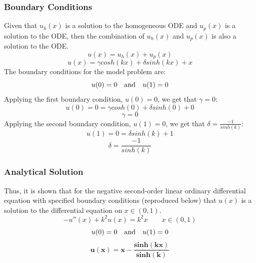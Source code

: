 \documentclass[10pt, reqno]{article}		%
\numberwithin{equation}{section}
\begin{document}
\subsubsection{Boundary Conditions}

Given that $u_h(x)$ is a solution to the homogeneous ODE and $u_p(x)$ is a solution to the ODE, then the combination of $u_h(x)$ and $u_p(x)$ is also a solution to the ODE.
\begin{equation}
u(x) = u_h(x) + u_p(x)
\end{equation}
\begin{equation}
u(x) = \gamma cosh(kx) + \delta sinh(kx) + x
\end{equation}
The boundary conditions for the model problem are:
\begin{equation}
u(0) = 0 \quad \textnormal{and} \quad u(1) = 0 
\end{equation}
Applying the first boundary condition, $u(0) = 0$, we get that $\gamma = 0$:
\begin{equation}
u(0) = 0 = \gamma cosh(0) + \delta sinh(0) + 0
\end{equation}
\begin{equation}
\gamma = 0
\end{equation}
Applying the second boundary condition, $u(1) = 0$, we get that $\delta = \frac{-1}{sinh(k)}$:
\begin{equation}
u(1) = 0 = \delta sinh(k) + 1
\end{equation}
\begin{equation}
\delta = \frac{-1}{sinh(k)}
\end{equation}

\subsubsection{Analytical Solution}

Thus, it is shown that for the negative second-order linear ordinary differential equation with specified boundary conditions (reproduced below) that $u(x)$ is a solution to the differential equation on $x \in (0, 1)$.
\begin{equation}
-u''(x)+k^2u(x)=k^2x \qquad x \in (0, 1)
\end{equation}
\begin{equation}
u(0) = 0 \quad \textnormal{and} \quad u(1) = 0 
\end{equation}
\begin{equation}
\mathbf{u(x) = x - \frac{sinh(kx)}{sinh(k)}}
\end{equation}
\end{document}
